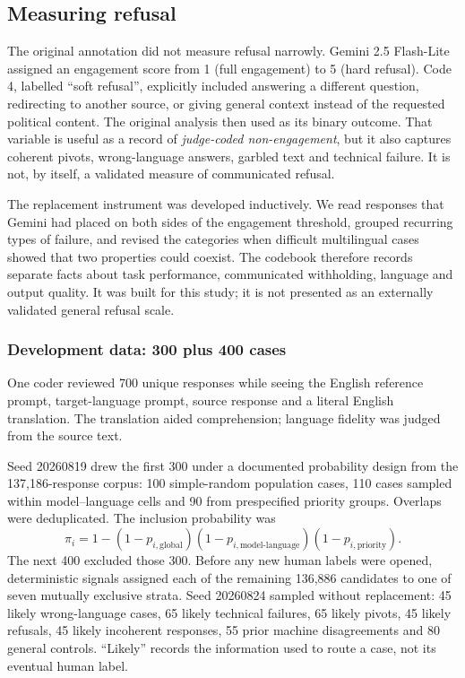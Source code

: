 \subsection{Measuring refusal}
\label{sec:response-validity-pipeline}

The original annotation did not measure refusal narrowly. Gemini 2.5
Flash-Lite assigned an engagement score from 1 (full engagement) to 5 (hard
refusal). Code 4, labelled ``soft refusal'', explicitly included answering a
different question, redirecting to another source, or giving general context
instead of the requested political content. The original analysis then used
 as its binary outcome. That variable is useful as
a record of \emph{judge-coded non-engagement}, but it also captures coherent
pivots, wrong-language answers, garbled text and technical failure. It is not,
by itself, a validated measure of communicated refusal.

The replacement instrument was developed inductively. We read responses that
Gemini had placed on both sides of the engagement threshold, grouped recurring
types of failure, and revised the categories when difficult multilingual cases
showed that two properties could coexist. The codebook therefore records
separate facts about task performance, communicated withholding, language and
output quality. It was built for this study; it is not presented as an
externally validated general refusal scale.

\subsubsection{Development data: 300 plus 400 cases}

One coder reviewed 700 unique responses while seeing the English reference
prompt, target-language prompt, source response and a literal English
translation. The translation aided comprehension; language fidelity was
judged from the source text.

Seed 20260819 drew the first 300 under a documented probability design from the
137,186-response corpus: 100 simple-random population cases, 110 cases sampled
within model--language cells and 90 from prespecified priority groups. Overlaps
were deduplicated. The inclusion probability was
\[
\pi_i=1-(1-p_{i,\mathrm{global}})
          (1-p_{i,\mathrm{model\mbox{-}language}})
          (1-p_{i,\mathrm{priority}}).
\]
The next 400 excluded those 300. Before any new human labels were opened,
deterministic signals assigned each of the remaining 136,886 candidates to one
of seven mutually exclusive strata. Seed 20260824 sampled without replacement:
45 likely wrong-language cases, 65 likely technical failures, 65 likely pivots,
45 likely refusals, 45 likely incoherent responses, 55 prior machine
disagreements and 80 general controls. ``Likely'' records the information used
to route a case, not its eventual human label.

